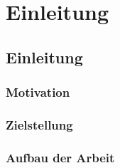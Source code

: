\chapter{Einleitung}\label{sec:chapter1}

\section{Einleitung}\label{sec:chapter2: Einleitung}

\subsection{Motivation}

\subsection{Zielstellung}

\subsection{Aufbau der Arbeit}
